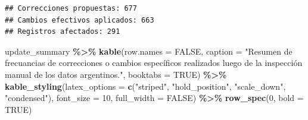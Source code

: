 \documentclass[sn-apa,pdflatex]{sn-jnl}
\newenvironment{Shaded}{\begin{snugshade}}{\end{snugshade}}
\newcommand{\AttributeTok}[1]{\textcolor[rgb]{0.13,0.29,0.53}{#1}}
\newcommand{\CommentTok}[1]{\textcolor[rgb]{0.56,0.35,0.01}{\textit{#1}}}
\newcommand{\ConstantTok}[1]{\textcolor[rgb]{0.56,0.35,0.01}{#1}}
\newcommand{\DecValTok}[1]{\textcolor[rgb]{0.00,0.00,0.81}{#1}}
\newcommand{\FunctionTok}[1]{\textcolor[rgb]{0.13,0.29,0.53}{\textbf{#1}}}
\newcommand{\NormalTok}[1]{#1}
\newcommand{\SpecialCharTok}[1]{\textcolor[rgb]{0.81,0.36,0.00}{\textbf{#1}}}
\newcommand{\StringTok}[1]{\textcolor[rgb]{0.31,0.60,0.02}{#1}}
\begin{document}
\begin{Shaded}
\end{Shaded}

\begin{verbatim}
## Correcciones propuestas: 677
## Cambios efectivos aplicados: 663
## Registros afectados: 291
\end{verbatim}

\begin{Shaded}
\begin{Highlighting}[]
\NormalTok{update\_summary }\SpecialCharTok{\%\textgreater{}\%}
    \FunctionTok{kable}\NormalTok{(}\AttributeTok{row.names =} \ConstantTok{FALSE}\NormalTok{, }\AttributeTok{caption =} \StringTok{"Resumen de frecuancias de correcciones o cambios específicos realizados luego de la inspección manual de los datos argentinos."}\NormalTok{,}
        \AttributeTok{booktabs =} \ConstantTok{TRUE}\NormalTok{) }\SpecialCharTok{\%\textgreater{}\%}
    \FunctionTok{kable\_styling}\NormalTok{(}\AttributeTok{latex\_options =} \FunctionTok{c}\NormalTok{(}\StringTok{"striped"}\NormalTok{, }\StringTok{"hold\_position"}\NormalTok{,}
        \StringTok{"scale\_down"}\NormalTok{, }\StringTok{"condensed"}\NormalTok{), }\AttributeTok{font\_size =} \DecValTok{10}\NormalTok{, }\AttributeTok{full\_width =} \ConstantTok{FALSE}\NormalTok{) }\SpecialCharTok{\%\textgreater{}\%}
    \FunctionTok{row\_spec}\NormalTok{(}\DecValTok{0}\NormalTok{, }\AttributeTok{bold =} \ConstantTok{TRUE}\NormalTok{)}
\end{Highlighting}
\end{Shaded}
\end{document}

